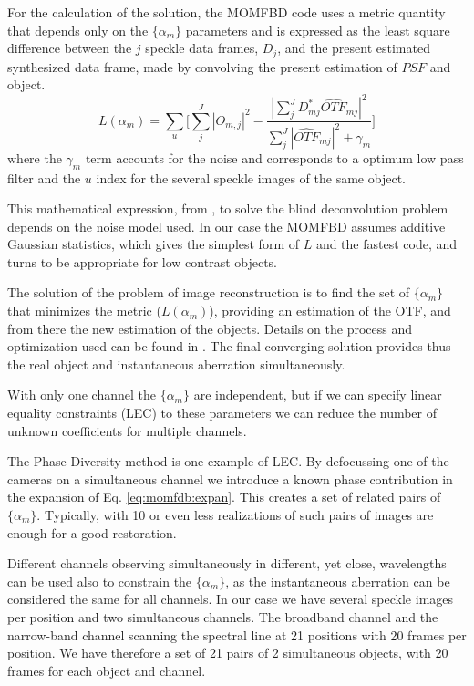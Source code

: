 For the calculation of the solution, the MOMFBD code uses a metric quantity that depends only on the $\{ \alpha_{m} \} $ parameters and is expressed as the least square difference between the $j$ speckle data frames, $D_{j} $, and the present estimated synthesized data frame, made by convolving the present estimation of $PSF$  and object. 
\begin{equation}
L(\alpha_{m})= \sum_{u} \Big[ \sum_{j}^{J} |O_{m,j}|^2 - \frac{|\sum_{j}^{J}D^{*}_{mj}\widehat{OTF}_{mj}|^2}{\sum_{j}^{J}|\widehat{OTF}_{mj}|^{2}+\gamma_{m}}\Big]
\end{equation} 
where the $\gamma_{m}$ term accounts for the noise and corresponds to a optimum low pass filter \citep{Lofdahl:2002qy} and the $u$ index for the several speckle images of the same object.

This mathematical expression, from \cite{1996ApJ...466.1087P}, to solve the blind deconvolution problem depends on the noise model used. In our case the MOMFBD assumes additive Gaussian statistics, which gives the simplest form of $L$ and the fastest code, and turns to be appropriate for low contrast objects.

The solution of the problem of image reconstruction is to find the set of $\{\alpha_{m} \}$ that minimizes the metric ($L(\alpha_{m})$), providing an estimation of the OTF, and from there the new estimation of the objects. Details on the process and optimization used can be found in \cite{Lofdahl:2002qy}. The final converging solution provides thus the real object and instantaneous aberration simultaneously.

With only one channel the $\{\alpha_{m} \}$ are independent, but if we can specify linear equality constraints (LEC) to these parameters we can reduce the number of unknown coefficients for multiple channels.

The Phase Diversity method is one example of LEC. By defocussing one of the cameras on a simultaneous channel we introduce a known phase contribution in the expansion of Eq. \ref{eq:momfdb:expan}. This creates a set of related pairs of $\{\alpha_{m} \}$.  Typically, with 10 or even less realizations of such pairs of images are enough for a good restoration.

Different channels observing simultaneously  in different, yet close, wavelengths can be used also to constrain the $\{\alpha_{m} \}$, as the instantaneous aberration can be considered the same for all channels. In our case we have several speckle images per position and two simultaneous channels. The broadband channel and the narrow-band channel scanning the spectral line at  21 positions with 20 frames per position. We have therefore a set of 21 pairs of 2 simultaneous objects, with 20 frames for each object and channel.

